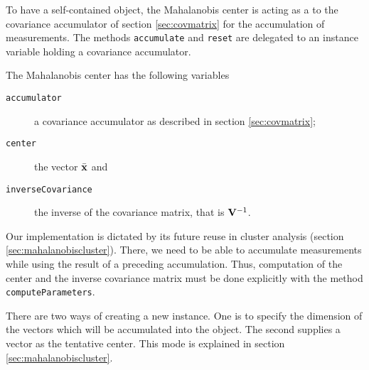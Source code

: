 \documentclass[twoside]{book}
\begin{document}
To have a self-contained object, the Mahalanobis center is acting
as a  to the covariance accumulator of section
\ref{sec:covmatrix} for the accumulation of measurements. The
methods {\tt accumulate} and {\tt reset} are delegated to an
instance variable holding a covariance accumulator.

\noindent The Mahalanobis center has the following variables
\begin{description}
  \item[\tt accumulator] a covariance accumulator as described in section
\ref{sec:covmatrix};
  \item[\tt center] the vector $\bar{\bf x}$ and
  \item[\tt inverseCovariance] the inverse of the covariance
  matrix, that is ${\bf V}^{-1}$.
\end{description}
Our implementation is dictated by its future reuse in cluster
analysis (\cf section \ref{sec:mahalanobiscluster}). There, we
need to be able to accumulate measurements while using the result
of a preceding accumulation. Thus, computation of the center and
the inverse covariance matrix must be done explicitly with the
method {\tt computeParameters}.

There are two ways of creating a new instance. One is to specify
the dimension of the vectors which will be accumulated into the
object. The second supplies a vector as the tentative center. This
mode is explained in section \ref{sec:mahalanobiscluster}.
\end{document}
